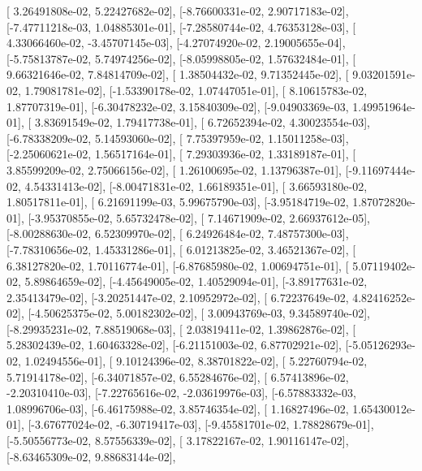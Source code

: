 \documentclass{article}
\begin{document}
       [ 3.26491808e-02,  5.22427682e-02],
       [-8.76600331e-02,  2.90717183e-02],
       [-7.47711218e-03,  1.04885301e-01],
       [-7.28580744e-02,  4.76353128e-03],
       [ 4.33066460e-02, -3.45707145e-03],
       [-4.27074920e-02,  2.19005655e-04],
       [-5.75813787e-02,  5.74974256e-02],
       [-8.05998805e-02,  1.57632484e-01],
       [ 9.66321646e-02,  7.84814709e-02],
       [ 1.38504432e-02,  9.71352445e-02],
       [ 9.03201591e-02,  1.79081781e-02],
       [-1.53390178e-02,  1.07447051e-01],
       [ 8.10615783e-02,  1.87707319e-01],
       [-6.30478232e-02,  3.15840309e-02],
       [-9.04903369e-03,  1.49951964e-01],
       [ 3.83691549e-02,  1.79417738e-01],
       [ 6.72652394e-02,  4.30023554e-03],
       [-6.78338209e-02,  5.14593060e-02],
       [ 7.75397959e-02,  1.15011258e-03],
       [-2.25060621e-02,  1.56517164e-01],
       [ 7.29303936e-02,  1.33189187e-01],
       [ 3.85599209e-02,  2.75066156e-02],
       [ 1.26100695e-02,  1.13796387e-01],
       [-9.11697444e-02,  4.54331413e-02],
       [-8.00471831e-02,  1.66189351e-01],
       [ 3.66593180e-02,  1.80517811e-01],
       [ 6.21691199e-03,  5.99675790e-03],
       [-3.95184719e-02,  1.87072820e-01],
       [-3.95370855e-02,  5.65732478e-02],
       [ 7.14671909e-02,  2.66937612e-05],
       [-8.00288630e-02,  6.52309970e-02],
       [ 6.24926484e-02,  7.48757300e-03],
       [-7.78310656e-02,  1.45331286e-01],
       [ 6.01213825e-02,  3.46521367e-02],
       [ 6.38127820e-02,  1.70116774e-01],
       [-6.87685980e-02,  1.00694751e-01],
       [ 5.07119402e-02,  5.89864659e-02],
       [-4.45649005e-02,  1.40529094e-01],
       [-3.89177631e-02,  2.35413479e-02],
       [-3.20251447e-02,  2.10952972e-02],
       [ 6.72237649e-02,  4.82416252e-02],
       [-4.50625375e-02,  5.00182302e-02],
       [ 3.00943769e-03,  9.34589740e-02],
       [-8.29935231e-02,  7.88519068e-03],
       [ 2.03819411e-02,  1.39862876e-02],
       [ 5.28302439e-02,  1.60463328e-02],
       [-6.21151003e-02,  6.87702921e-02],
       [-5.05126293e-02,  1.02494556e-01],
       [ 9.10124396e-02,  8.38701822e-02],
       [ 5.22760794e-02,  5.71914178e-02],
       [-6.34071857e-02,  6.55284676e-02],
       [ 6.57413896e-02, -2.20310410e-03],
       [-7.22765616e-02, -2.03619976e-03],
       [-6.57883332e-03,  1.08996706e-03],
       [-6.46175988e-02,  3.85746354e-02],
       [ 1.16827496e-02,  1.65430012e-01],
       [-3.67677024e-02, -6.30719417e-03],
       [-9.45581701e-02,  1.78828679e-01],
       [-5.50556773e-02,  8.57556339e-02],
       [ 3.17822167e-02,  1.90116147e-02],
       [-8.63465309e-02,  9.88683144e-02],
\end{document}
